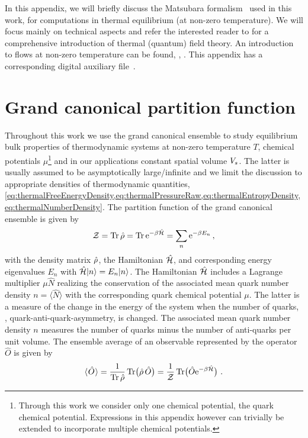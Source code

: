 In this appendix, we will briefly discuss the Matsubara formalism~\cite{Matsubara:1955ws} used in this work, for computations in thermal equilibrium (at non-zero temperature).
We will focus mainly on technical aspects and refer the interested reader to  for a comprehensive introduction of thermal (quantum) field theory. An introduction to \frg{} flows at non-zero temperature can be found, \eg{}, . This appendix has a corresponding digital auxiliary file~\cite{Steil:2023PhDThermodynamicsNB}.

\section{Grand canonical partition function}\label{app:grandCanonicalPartitionFunction}
Throughout this work we use the grand canonical ensemble to study equilibrium bulk properties of thermodynamic systems at non-zero temperature $T$, chemical potentials $\mu$\footnote{
	Through this work we consider only one chemical potential, \viz{} the quark chemical potential.
	Expressions in this appendix however can trivially be extended to incorporate multiple chemical potentials.%
} and in our applications constant spatial volume $\spatialVolume{}$. 
The latter is usually assumed to be asymptotically large/infinite and we limit the discussion to appropriate densities of thermodynamic quantities, \cf{} \cref{eq:thermalFreeEnergyDensity,eq:thermalPressureRaw,eq:thermalEntropyDensity,eq:thermalNumberDensity}.
The partition function of the grand canonical ensemble is given by
\begin{align}
	\mathcal{Z}=\operatorname{Tr}\hat{\rho}=\operatorname{Tr}\mathrm{e}^{-\beta \hat{\mathcal{H}}}=\sum_n \mathrm{e}^{-\beta E_n}\,,
	\label{eq:thermalPartionFunction}
\end{align}
with the density matrix $\hat{\rho}$, the Hamiltonian $\hat{\mathcal{H}}$, and corresponding energy eigenvalues $E_n$ with $\hat{\mathcal{H}}|n\rangle=E_n|n\rangle$.
The Hamiltonian $\hat{\mathcal{H}}$ includes a Lagrange multiplier $\mu \hat{N}$ realizing the conservation of the associated mean quark number density $n=\langle \hat{N}\rangle$ with the corresponding quark chemical potential $\mu$.
The latter is a measure of the change in the energy of the system when the number of quarks, \ie{}, quark-anti-quark-asymmetry,  is changed.
The associated mean quark number density $n$ measures the number of quarks minus the number of anti-quarks per unit volume.
The ensemble average of an observable represented by the operator $\hat{O}$ is given by
\begin{align}
	\langle\mkern1mu\hat{O}\mkern1mu\rangle = \frac{1}{\Tr\thermalDensityMatrix}\Tr\!\del[1]{\thermalDensityMatrix\,\hat{O}} =\frac{1}{\thermalPartionFunction}\Tr\!\del[1]{\hat{O}\eu^{-\beta\thermalHamiltonian}}\, .
	\label{eq:thermalAverage}
\end{align}

